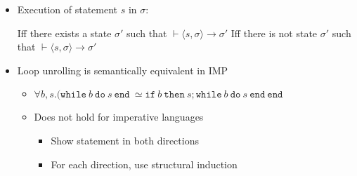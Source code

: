 \begin{itemize}
\begin{itemize}
\begin{itemize}
\begin{itemize}
\begin{itemize}
                                \end{itemize}
                        \end{itemize}
                \end{itemize}
                \begin{itemize}
                    \item Execution of statement $s$ in $\sigma$:
                        \begin{itemize}
                             Iff there exists a state $\sigma'$ such that $\vdash \langle s, \sigma \rangle \to \sigma'$
                             Iff there is not state $\sigma'$ such that $\vdash \langle s, \sigma \rangle \to \sigma'$
                        \end{itemize}
                \end{itemize}
        \end{itemize}
        \begin{itemize}
                \begin{itemize}
                     are two statements $s_1, s_2$ iff $\forall \sigma, \sigma'. (\vdash \langle s_1, \sigma \rangle \to \sigma' \iff \vdash \langle s_2, \sigma \rangle \to \sigma')$
                        \begin{itemize}
                             $s_1 \simeq s_2$
                        \end{itemize}
                    \item Loop unrolling is semantically equivalent in IMP
                        \begin{itemize}
                            \item $\forall b, s. (\mathtt{while} \ b \ \mathtt{do} \ s \ \mathtt{end} \ \simeq \mathtt{if} \ b \ \mathtt{then} \ s; \mathtt{while} \ b \ \mathtt{do} \ s \ \mathtt{end \ end}$
                            \item Does not hold for imperative languages
                                \begin{itemize}
                                    \item Show statement in both directions
                                    \item For each direction, use structural induction
                                \end{itemize}

\end{itemize}
\end{itemize}
\end{itemize}
\end{itemize}
